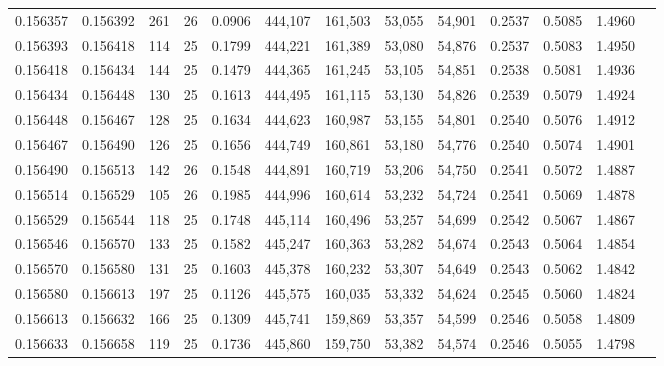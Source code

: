 \begin{tabular}{rrrrrrrrrrrrr}
0.156357 & 0.156392 & 261 &  26 &                                     0.0906 & 444,107 & 161,503 &  53,055 &  54,901 & 0.2537 & 0.5085 & 1.4960 \\
0.156393 & 0.156418 & 114 &  25 &                                     0.1799 & 444,221 & 161,389 &  53,080 &  54,876 & 0.2537 & 0.5083 & 1.4950 \\
0.156418 & 0.156434 & 144 &  25 &                                     0.1479 & 444,365 & 161,245 &  53,105 &  54,851 & 0.2538 & 0.5081 & 1.4936 \\
0.156434 & 0.156448 & 130 &  25 &                                     0.1613 & 444,495 & 161,115 &  53,130 &  54,826 & 0.2539 & 0.5079 & 1.4924 \\
0.156448 & 0.156467 & 128 &  25 &                                     0.1634 & 444,623 & 160,987 &  53,155 &  54,801 & 0.2540 & 0.5076 & 1.4912 \\
0.156467 & 0.156490 & 126 &  25 &                                     0.1656 & 444,749 & 160,861 &  53,180 &  54,776 & 0.2540 & 0.5074 & 1.4901 \\
0.156490 & 0.156513 & 142 &  26 &                                     0.1548 & 444,891 & 160,719 &  53,206 &  54,750 & 0.2541 & 0.5072 & 1.4887 \\
0.156514 & 0.156529 & 105 &  26 &                                     0.1985 & 444,996 & 160,614 &  53,232 &  54,724 & 0.2541 & 0.5069 & 1.4878 \\
0.156529 & 0.156544 & 118 &  25 &                                     0.1748 & 445,114 & 160,496 &  53,257 &  54,699 & 0.2542 & 0.5067 & 1.4867 \\
0.156546 & 0.156570 & 133 &  25 &                                     0.1582 & 445,247 & 160,363 &  53,282 &  54,674 & 0.2543 & 0.5064 & 1.4854 \\
0.156570 & 0.156580 & 131 &  25 &                                     0.1603 & 445,378 & 160,232 &  53,307 &  54,649 & 0.2543 & 0.5062 & 1.4842 \\
0.156580 & 0.156613 & 197 &  25 &                                     0.1126 & 445,575 & 160,035 &  53,332 &  54,624 & 0.2545 & 0.5060 & 1.4824 \\
0.156613 & 0.156632 & 166 &  25 &                                     0.1309 & 445,741 & 159,869 &  53,357 &  54,599 & 0.2546 & 0.5058 & 1.4809 \\
0.156633 & 0.156658 & 119 &  25 &                                     0.1736 & 445,860 & 159,750 &  53,382 &  54,574 & 0.2546 & 0.5055 & 1.4798 \\

\end{tabular}
